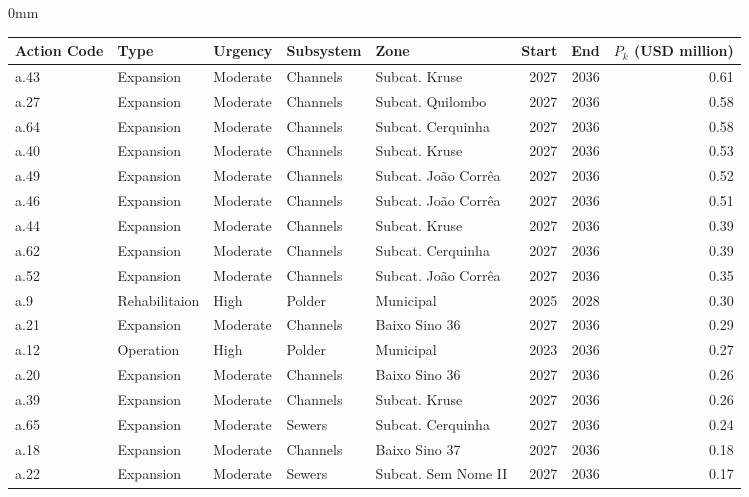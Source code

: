 \documentclass[./main.tex]{subfiles}
\begin{document}
\begin{adjustwidth}{\bodytab}{0mm}
\begin{table}[h]
    \centering
    \tiny
\begin{tabular}{lllllrrr}
\toprule
\textbf{Action Code} &          \textbf{Type}&   \textbf{Urgency} &   \textbf{Subsystem} &                \textbf{Zone} &  \textbf{Start} &  \textbf{End} &    \textbf{$P_k$ (USD million)} \\
\midrule
a.43 &     Expansion &  Moderate & Channels &       Subcat. Kruse &   2027 & 2036 &  0.61 \\
a.27 &     Expansion &  Moderate & Channels &    Subcat. Quilombo &   2027 & 2036 &  0.58 \\
a.64 &     Expansion &  Moderate & Channels &   Subcat. Cerquinha &   2027 & 2036 &  0.58 \\
a.40 &     Expansion &  Moderate & Channels &       Subcat. Kruse &   2027 & 2036 &  0.53 \\
a.49 &     Expansion &  Moderate & Channels & Subcat. João Corrêa &   2027 & 2036 &  0.52 \\
a.46 &     Expansion &  Moderate & Channels & Subcat. João Corrêa &   2027 & 2036 &  0.51 \\
a.44 &     Expansion &  Moderate & Channels &       Subcat. Kruse &   2027 & 2036 &  0.39 \\
a.62 &     Expansion &  Moderate & Channels &   Subcat. Cerquinha &   2027 & 2036 &  0.39 \\
a.52 &     Expansion &  Moderate & Channels & Subcat. João Corrêa &   2027 & 2036 &  0.35 \\
 a.9 & Rehabilitaion &      High &   Polder &           Municipal &   2025 & 2028 &  0.30 \\
a.21 &     Expansion &  Moderate & Channels &       Baixo Sino 36 &   2027 & 2036 &  0.29 \\
a.12 &     Operation &      High &   Polder &           Municipal &   2023 & 2036 &  0.27 \\
a.20 &     Expansion &  Moderate & Channels &       Baixo Sino 36 &   2027 & 2036 &  0.26 \\
a.39 &     Expansion &  Moderate & Channels &       Subcat. Kruse &   2027 & 2036 &  0.26 \\
a.65 &     Expansion &  Moderate &   Sewers &   Subcat. Cerquinha &   2027 & 2036 &  0.24 \\
a.18 &     Expansion &  Moderate & Channels &       Baixo Sino 37 &   2027 & 2036 &  0.18 \\
a.22 &     Expansion &  Moderate &   Sewers & Subcat. Sem Nome II &   2027 & 2036 &  0.17 \\

\end{tabular}
\end{table}
\end{adjustwidth}
\end{document}
